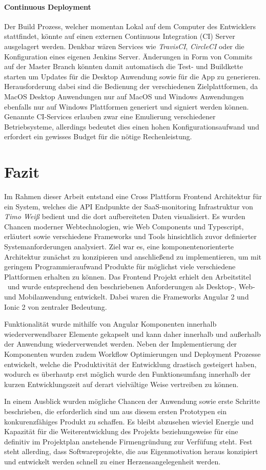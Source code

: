 \subsubsection{Continuous Deployment}

Der Build Prozess, welcher momentan Lokal auf dem Computer des Entwicklers stattfindet, könnte auf einen externen Continuous Integration (CI) Server ausgelagert werden.
Denkbar wären Services wie \emph{TravisCI}, \emph{CircleCI} oder die Konfiguration eines eigenen Jenkins Server.
Änderungen in Form von Commits auf der Master Branch könnten damit automatisch die Test- und Buildkette starten um Updates für die Desktop Anwendung sowie für die App zu generieren.
Herausforderung dabei sind die Bedienung der verschiedenen Zielplattformen, da MacOS Desktop Anwendungen nur auf MacOS und
Windows Anwendungen ebenfalls nur auf Windows Plattformen generiert und signiert werden können.
Genannte CI-Services erlauben zwar eine Emulierung verschiedener Betriebsysteme,
allerdings bedeutet dies einen hohen Konfigurationsaufwand und erfordert ein gewisses Budget für die nötige Rechenleistung.


\chapter{Fazit}

Im Rahmen dieser Arbeit entstand eine Cross Plattform Frontend Architektur für ein System,
welches die API Endpunkte der SaaS-monitoring Infrastruktur von \emph{Timo Weiß} bedient und die dort aufbereiteten Daten visualisiert.
Es wurden Chancen moderner Webtechnologien, wie Web Components und Typescript, erläutert
sowie verschiedene Frameworks und Tools hinsichtlich zuvor definierter Systemanforderungen analysiert.
Ziel war es, eine komponentenorienterte Architektur zunächst zu konzipieren und anschließend zu implementieren, um
mit geringem Programmieraufwand Produkte für möglichst viele verschiedene Plattformen erhalten zu können.
Das Frontend Projekt erhielt den Arbeitstitel \projectname{} und wurde entsprechend den beschriebenen Anforderungen
als Desktop-, Web- und Mobilanwendung entwickelt. Dabei waren die Frameworks Angular 2 und Ionic 2 von zentraler Bedeutung.

Funktionalität wurde mithilfe von Angular Komponenten innerhalb wiederverwendbarer
Elemente gekapselt und kann daher innerhalb und außerhalb der Anwendung wiederverwendet werden.
Neben der Implementierung der Komponenten wurden zudem Workflow Optimierungen und Deployment Prozesse entwickelt,
welche die Produktivität der Entwicklung drastisch gesteigert haben, wodurch es überhautp erst möglich wurde den Funktionsumfang
innerhalb der kurzen Entwicklungszeit auf derart vielvältige Weise vertreiben zu können.

In einem Ausblick wurden mögliche Chancen der Anwendung sowie erste Schritte beschrieben, die erforderlich sind um aus diesem ersten
Prototypen ein konkurenzfähiges Produkt zu schaffen.
Es bleibt abzusehen wieviel Energie und Kapazität für die Weiterentwicklung des Projekts beziehungsweise für eine definitiv im Projektplan anstehende Firmengründung zur Verfüfung steht.
Fest steht allerding, dass Softwareprojekte, die aus Eigenmotivation heraus konzipiert und entwickelt werden schnell zu einer Herzensangelegenheit werden.
